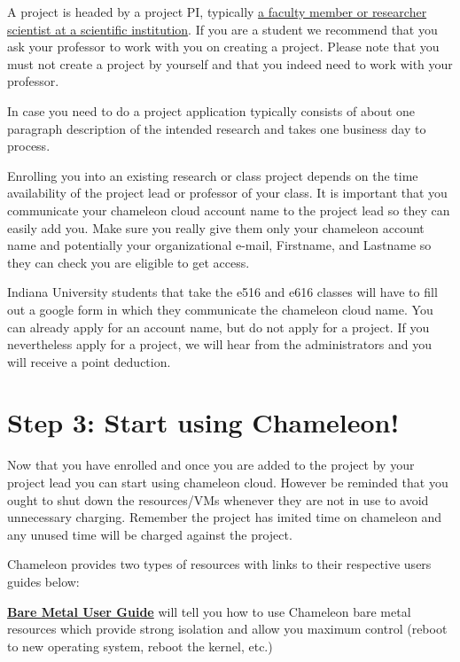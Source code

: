 A project is headed by a project PI, typically
\href{https://www.chameleoncloud.org/docs/user-faq/\#toc-who-is-eligible-to-be-chameleon-pi-and-how-do-i-make-sure-that-my-pi-status-is-reflected-in-my-profile-}{a
faculty member or researcher scientist at a scientific institution}. If
you are a student we recommend that you ask your professor to work with
you on creating a project. Please note that you must not create a
project by yourself and that you indeed need to work with your
professor. 

In case you need to do a project application typically consists of
about one paragraph description of the intended research and takes one
business day to process.

Enrolling you into an existing research or class project depends on
the time availability of the project lead or professor of your
class. It is important that you communicate your chameleon cloud
account name to the project lead so they can easily add you. Make sure
you really give them only your chameleon account name and potentially
your organizational e-mail, Firstname, and Lastname so they can check
you are eligible to get access. 

\begin{IU}
Indiana University students that take the e516 and e616 classes will
have to fill out a google form in which they communicate the chameleon
cloud name. You can already apply for an account name, but do not
apply for a project. If you nevertheless apply for a project, we will
hear from the administrators and you will receive a point deduction.
\end{IU}

\section*{Step 3: Start using Chameleon!}\label{using-chameleon}

Now that you have enrolled and once you are added to the project by your
project lead you can start using chameleon cloud. However be reminded
that you ought to shut down the resources/VMs whenever they are not in
use to avoid unnecessary charging. Remember the project has imited
time on chameleon and any unused time will be charged against the project.

Chameleon provides two types of resources with links to their respective
users guides below:

\textbf{\href{https://www.chameleoncloud.org/docs/bare-metal-user-guide-old/}{Bare
Metal User Guide}} will tell you how to use Chameleon bare metal
resources which provide strong isolation and allow you maximum control
(reboot to new operating system, reboot the kernel, etc.)


